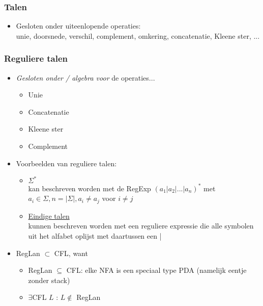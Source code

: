 \documentclass[kulak]{kulakarticle}
\newcommand{\abs}[1]{\lvert #1 \rvert}
\theoremstyle{definition}
\begin{document}
	\subsubsection*{Talen}

	\begin{itemize}
		\item Gesloten onder uiteenlopende operaties:\\unie, doorsnede, verschil, complement, omkering, concatenatie, Kleene ster, ...
	\end{itemize}

	\subsubsection*{Reguliere talen}

	\begin{itemize}
		\item \textit{Gesloten onder / algebra voor} de operaties... \begin{itemize}
			\item Unie
			\item Concatenatie
			\item Kleene ster
			\item Complement
		\end{itemize}
		\item Voorbeelden van reguliere talen:
		\begin{itemize}
			\item \underline{\(\Sigma^*\)}\\
			kan beschreven worden met de RegExp \((a_1|a_2|...|a_n)^*\) met \(a_i\in \Sigma, n=\abs{\Sigma}, a_i\neq a_j\) voor \(i\neq j\)
			\item \underline{Eindige talen}\\
			kunnen beschreven worden met een reguliere expressie die alle symbolen uit het alfabet oplijst met daartussen een |
		\end{itemize}
		\item RegLan \(\subset\) CFL, want
		\begin{itemize}
			\item RegLan \(\subseteq\) CFL: elke NFA is een speciaal type PDA (namelijk eentje zonder stack)
			\item \(\exists\)CFL \(L\) : \(L \notin \) RegLan
		\end{itemize}
	\end{itemize}
\end{document}

